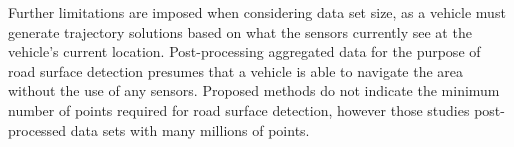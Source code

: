 \documentclass[journal,onecolumn]{IEEEtran}
\begin{document}
%	
	{Further limitations are imposed when considering data set size, as a vehicle must generate trajectory solutions based on what the sensors currently see at the vehicle's current location. Post-processing aggregated data for the purpose of road surface detection presumes that a vehicle is able to navigate the area without the use of any sensors. Proposed methods \cite{yadav_extraction_2017,yadav_road_2018,yadav_rural_2018,yadav_pole-shaped_2015,miyazaki_line-based_2014,yang_semi-automated_2013,liu_new_2013,qiu_fast_2016} do not indicate the minimum number of points required for road surface detection, however those studies post-processed data sets with many millions of points.}
	
\end{document}
